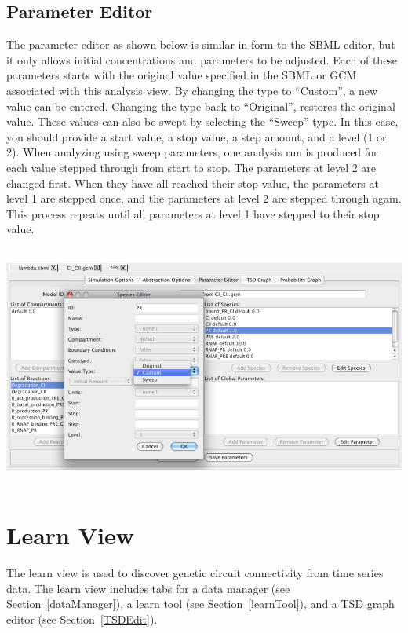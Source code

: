 \documentclass[titlepage,11pt]{article}
\begin{document}
\subsection{\label{paramEdit}Parameter Editor}

\noindent
The parameter editor as shown below is similar in form to the SBML editor,
but it only allows initial concentrations and parameters to be
adjusted. Each of these parameters starts with the original value
specified in the SBML or GCM associated with
this analysis view. By changing the type to ``Custom'', a
new value can be entered. Changing the type back to ``Original'',
restores the original value. These values can also be swept by
selecting the ``Sweep'' type. In this case, you should
provide a start value, a stop value, a step amount, and a level
(1 or 2). When analyzing using sweep parameters, one analysis run
is produced for each value stepped through from start to stop.
The parameters at level 2 are changed first. When they have all
reached their stop value, the parameters at level 1 are stepped
once, and the parameters at level 2 are stepped through again.
This process repeats until all parameters at level 1 have stepped
to their stop value. 
\begin{center}
\includegraphics[height=80mm]{screenshots/paramEdit}
\end{center}

\section{\label{Learn}Learn View}

\noindent
The learn view is used to discover genetic circuit
connectivity from time series data. The learn view includes tabs
for a data manager (see Section~\ref{dataManager}), 
a learn tool (see Section~\ref{learnTool}), and a 
TSD graph editor (see Section~\ref{TSDEdit}).
\end{document}
